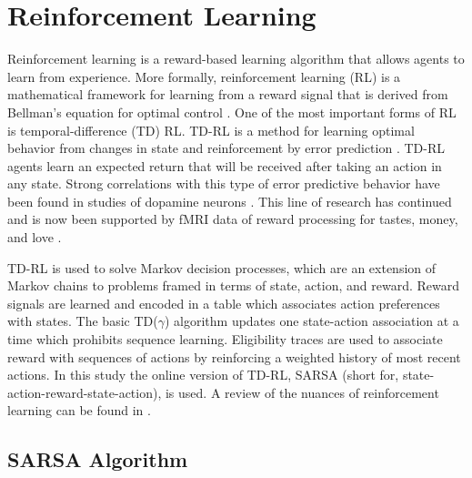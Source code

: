 \section{Reinforcement Learning}
Reinforcement learning is a reward-based learning algorithm that allows agents
to learn from experience. More formally, reinforcement
learning (RL) is a mathematical framework for learning from a reward signal that
is derived from Bellman's equation for optimal control \cite{sutton1998introduction}. One of
the most important forms of RL is temporal-difference (TD) RL. TD-RL is a method
for learning optimal behavior from changes in state and reinforcement by error
prediction \cite{sutton1988learning}. TD-RL agents learn an expected return that will be
received after taking an action in any state. Strong correlations with this type of
error predictive behavior have been found in studies of dopamine neurons
\cite{schultz1993responses}. This line of research has continued and is now been
supported by fMRI data of reward processing for tastes, money, and love
\cite{haber2009reward}.

TD-RL is used to solve Markov decision processes, which are an extension of
Markov chains to problems framed in terms of state, action, and reward.
Reward signals are learned and encoded
in a table which associates action preferences with states. The basic
TD($\gamma$) algorithm updates one state-action association at a time which
prohibits sequence learning. Eligibility traces are used to associate reward
with sequences of actions by reinforcing a weighted history of most recent
actions. In this study the online version of TD-RL, SARSA (short for,
state-action-reward-state-action), is used. A review of the nuances of
reinforcement learning can be found in \cite{sutton1998introduction}.

\subsection{SARSA Algorithm}

